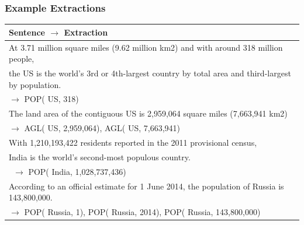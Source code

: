 \documentclass[a4paper,10pt]{article}
\begin{document}
\subsubsection{Example Extractions}
\begin{tabular}{|l|} 
\hline
Sentence $\rightarrow$ Extraction \\
\hline
At 3.71 million square miles (9.62 million km2) and with around 318 million people,\\ 
the US is the world's 3rd or 4th-largest country by total area and third-largest by population. \\$\rightarrow$ POP( US, 318) \\
\hline
The land area of the contiguous US is 2,959,064 square miles (7,663,941 km2)\\ $\rightarrow$  AGL( US, 2,959,064), AGL( US, 7,663,941) \\
\hline
With 1,210,193,422 residents reported in the 2011 provisional census,\\ 
India is the world's second-most populous country.\\\ $\rightarrow$ POP( India, 1,028,737,436)\\ 
\hline
According to an official estimate for 1 June 2014, the population of Russia is 143,800,000.\\ $\rightarrow$
POP( Russia, 1), POP( Russia, 2014), POP( Russia, 143,800,000) \\
\hline
\end{tabular}


\end{document}

